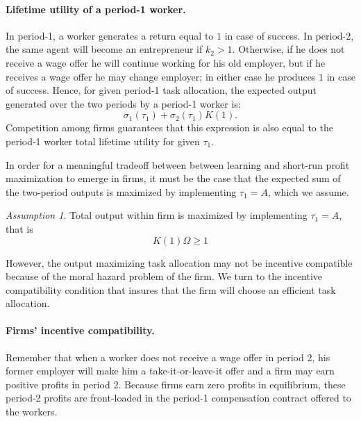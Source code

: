 \documentclass[12pt,american]{paper}
\theoremstyle{remark}
\newtheorem{ass}{Assumption}
\begin{document}
\paragraph{Lifetime utility of a period-1 worker.}
In period-1, a worker generates a return equal to $1$ in case of success. In period-2, the same agent will become an entrepreneur if $k_2>1$. Otherwise, if he does not receive a wage offer he will continue working for his old employer, but if he receives a wage offer he may change employer; in either case he produces $1$ in case of success. Hence, for given period-1 task allocation, the expected output generated over the two periods by a period-1 worker is:
\[
\sigma_1(\tau_1)+\sigma_2(\tau_1) K(1).
\]
Competition among firms guarantees that this expression is also equal to the period-1 worker total lifetime utility for given $\tau_1$. 

In order for a meaningful tradeoff between  between learning and short-run profit maximization to emerge in firms, it must be the case that the expected sum of the two-period outputs is maximized by implementing $\tau_1=A$, which we assume. 
%
\begin{ass}\label{ass: necessary for learning}
Total output within firm is maximized by implementing $\tau_1=A$, that is
\begin{equation}
 K(1) \Omega \geq 1
\end{equation}
\end{ass}

However, the output maximizing task allocation may not be incentive compatible because of the moral hazard problem of the firm. We turn to the incentive compatibility condition that insures that the firm will choose an efficient task allocation.

\paragraph{Firms' incentive compatibility.} Remember that when a worker does not receive a wage offer in period 2, his former employer will make him a take-it-or-leave-it offer and a firm may earn positive profits in period 2. Because firms earn zero profits in equilibrium, these period-2 profits are front-loaded in the period-1 compensation contract offered to the  workers. 
\end{document}
